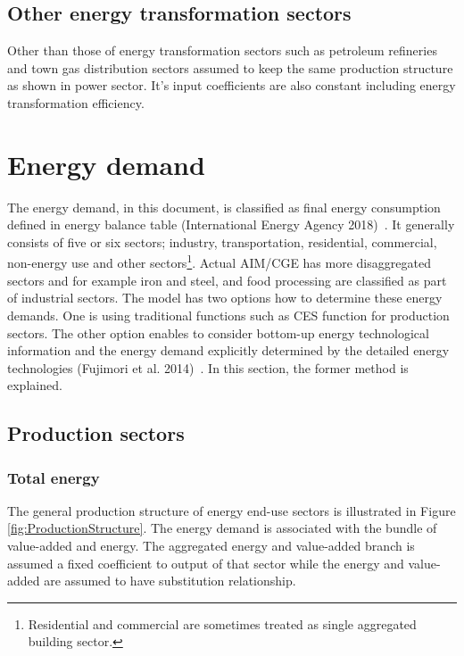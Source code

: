 \documentclass[10pt,a4paper,titlepage,dvipdfmx]{book}
\begin{document}
\subsection{\label{subsec:OthEneTraSec}{Other energy transformation sectors}}

Other than those of energy transformation sectors such as petroleum refineries and town gas distribution sectors assumed to keep the same production structure as shown in power sector. It's input coefficients are also constant including energy transformation efficiency.

\section{\label{sec:EneDem}{Energy demand}}

The energy demand, in this document, is classified as final energy consumption defined in energy balance table (International Energy Agency 2018)~\cite{RN3606}. It generally consists of five or six sectors; industry, transportation, residential, commercial, non-energy use and other sectors\footnote{Residential and commercial are sometimes treated as single aggregated building sector.}. Actual AIM/CGE has more disaggregated sectors and for example iron and steel, and food processing are classified as part of industrial sectors. The model has two options how to determine these energy demands. One is using traditional functions such as CES function for production sectors. The other option enables to consider bottom-up energy technological information and the energy demand explicitly determined by the detailed energy technologies (Fujimori et al. 2014)~\cite{RN4010}. In this section, the former method is explained.

\subsection{\label{subsec:ProSec}{Production sectors}}

\subsubsection{\label{subsubsec:TotEne}Total energy}

The general production structure of energy end-use sectors is illustrated in Figure \ref{fig:ProductionStructure}. The energy demand is associated with the bundle of value-added and energy. The aggregated energy and value-added branch is assumed a fixed coefficient to output of that sector while the energy and value-added are assumed to have substitution relationship.
\end{document}
